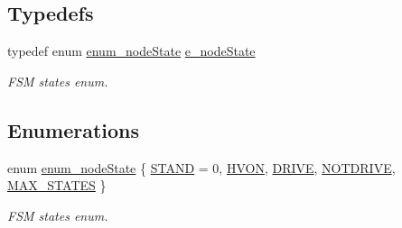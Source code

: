 \subsection*{Typedefs}
\begin{DoxyCompactItemize}
\item 
\mbox{\label{group__stages__group_ga29e04432d3efcac24a5ae62572a6e8f2}} 
typedef enum \mbox{\hyperlink{group__stages__group_ga3136d2815abe9d284f985e0a7ec68646}{enum\+\_\+node\+State}} \mbox{\hyperlink{group__stages__group_ga29e04432d3efcac24a5ae62572a6e8f2}{e\+\_\+node\+State}}
\begin{DoxyCompactList}\small\item\em F\+SM states enum. \end{DoxyCompactList}\end{DoxyCompactItemize}
\subsection*{Enumerations}
\begin{DoxyCompactItemize}
\item 
enum \mbox{\hyperlink{group__stages__group_ga3136d2815abe9d284f985e0a7ec68646}{enum\+\_\+node\+State}} \{ \newline
\mbox{\hyperlink{group__stages__group_gga3136d2815abe9d284f985e0a7ec68646af422fb81d42ecd479de08e64b6533d18}{S\+T\+A\+ND}} = 0, 
\mbox{\hyperlink{group__stages__group_gga3136d2815abe9d284f985e0a7ec68646a1fa0533f275ef4762e6eafc3b35bfd02}{H\+V\+ON}}, 
\mbox{\hyperlink{group__stages__group_gga3136d2815abe9d284f985e0a7ec68646af7b6d6d8e5e14633d388ef9cc7a941b7}{D\+R\+I\+VE}}, 
\mbox{\hyperlink{group__stages__group_gga3136d2815abe9d284f985e0a7ec68646a58841f2207f211031fa8cdfa2152537a}{N\+O\+T\+D\+R\+I\+VE}}, 
\newline
\mbox{\hyperlink{group__stages__group_gga3136d2815abe9d284f985e0a7ec68646a6e301d1f2fcd23ccfc4de60c6e6cc9ce}{M\+A\+X\+\_\+\+S\+T\+A\+T\+ES}}
 \}
\begin{DoxyCompactList}\small\item\em F\+SM states enum. \end{DoxyCompactList}\end{DoxyCompactItemize}
